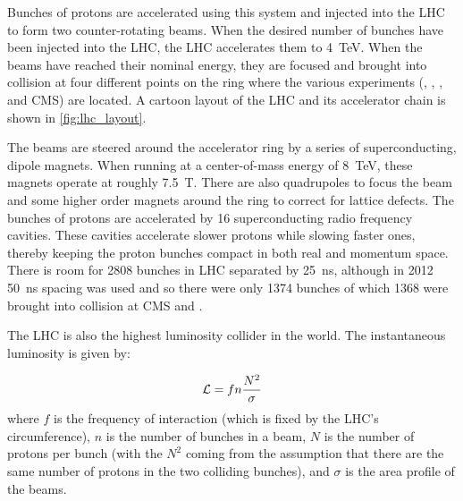Bunches of protons are accelerated using this system and injected into the LHC
to form two counter-rotating beams. When the desired number of bunches have
been injected into the LHC, the LHC accelerates them to \SI{4}{\TeV}. When the
beams have reached their nominal energy, they are focused and brought into
collision at four different points on the ring where the various experiments
(\ALICE, \ATLAS, \LHCB, and CMS) are located. A cartoon layout of the LHC and
its accelerator chain is shown in \cref{fig:lhc_layout}.

The beams are steered around the accelerator ring by a series of
superconducting, dipole magnets. When running at a center-of-mass energy of
\SI{8}{\TeV}, these magnets operate at roughly \SI{7.5}{\tesla}. There are also
quadrupoles to focus the beam and some higher order magnets around the ring to
correct for lattice defects. The bunches of protons are accelerated by \num{16}
superconducting radio frequency cavities. These cavities accelerate slower
protons while slowing faster ones, thereby keeping the proton bunches compact
in both real and momentum space. There is room for 2808 bunches in LHC
separated by \SI{25}{\nano\second}, although in 2012 \SI{50}{\nano\second}
spacing was used and so there were only \num{1374} bunches of which \num{1368}
were brought into collision at CMS and \ATLAS.

The LHC is also the highest luminosity collider in the world. The instantaneous
luminosity is given by:

\begin{equation}
    \mathcal{L} = f n \frac{N^{2}}{\sigma}
\end{equation}
%
where $f$ is the frequency of interaction (which is fixed by the LHC's
circumference), $n$ is the number of bunches in a beam, $N$ is the number of
protons per bunch (with the $N^{2}$ coming from the assumption that there are
the same number of protons in the two colliding bunches), and $\sigma$ is the
area profile of the beams.

